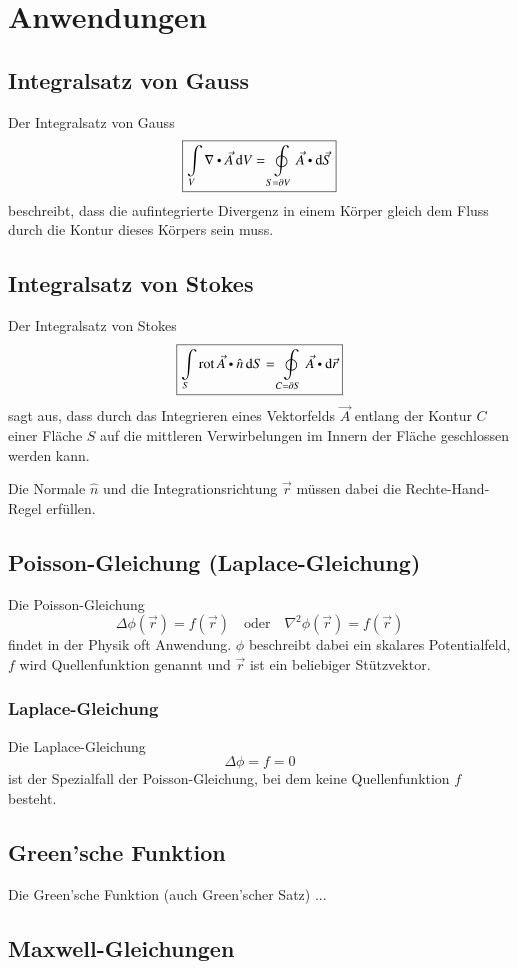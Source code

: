 
\section{Anwendungen}

\subsection{Integralsatz von Gauss}
Der Integralsatz von Gauss 
\[
    \boxed{\int\limits_{V} \nabla \dotp \vec{A} \diff V = \oint\limits_{S = \partial V} \vec{A} \dotp \diff \vec{S}}
\]
beschreibt, dass die aufintegrierte Divergenz in einem Körper gleich dem Fluss durch die Kontur dieses Körpers sein muss.


\subsection{Integralsatz von Stokes}
Der Integralsatz von Stokes
\[
    \boxed{\int\limits_{S} \rot \vec{A} \dotp \hat{n} \diff S = \oint\limits_{C = \partial S} \vec{A} \dotp \diff \vec{r}}
\]
sagt aus, dass durch das Integrieren eines Vektorfelds $\vec{A}$ entlang der Kontur $C$ einer Fläche $S$ auf die mittleren Verwirbelungen im Innern der Fläche geschlossen werden kann.

Die Normale $\hat{n}$ und die Integrationsrichtung $\vec{r}$ müssen dabei die Rechte-Hand-Regel erfüllen.


\subsection{Poisson-Gleichung (Laplace-Gleichung)}
Die Poisson-Gleichung
\[
    \boxed{\Delta \phi (\vec{r})
    = f(\vec{r})}
    \hspace{1em}\text{oder}\hspace{1em}
    \boxed{\nabla^2 \phi (\vec{r})
    = f(\vec{r})}
\]
findet in der Physik oft Anwendung. $\phi$ beschreibt dabei ein skalares Potentialfeld, $f$ wird Quellenfunktion genannt und $\vec{r}$ ist ein beliebiger Stützvektor.

\subsubsection{Laplace-Gleichung}
Die Laplace-Gleichung
\[\boxed{\Delta \phi = f = 0}\] 
ist der Spezialfall der Poisson-Gleichung, bei dem keine Quellenfunktion $f$ besteht.


\subsection{Green'sche Funktion}
Die Green'sche Funktion (auch Green'scher Satz) ...


\subsection{Maxwell-Gleichungen}
